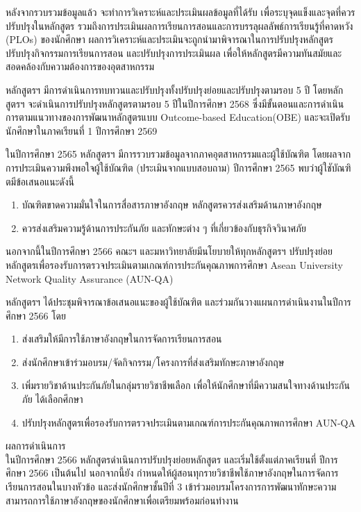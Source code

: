 หลังจากรวบรวมข้อมูลแล้ว จะทำการวิเคราะห์และประเมินผลข้อมูลที่ได้รับ เพื่อระบุจุดแข็งและจุดที่ควรปรับปรุงในหลักสูตร รวมถึงการประเมินผลการเรียนการสอนและการบรรลุผลลัพธ์การเรียนรู้ที่คาดหวัง (PLOs) ของนักศึกษา ผลการวิเคราะห์และประเมินจะถูกนำมาพิจารณาในการปรับปรุงหลักสูตร ปรับปรุงกิจกรรมการเรียนการสอน และปรับปรุงการประเมินผล เพื่อให้หลักสูตรมีความทันสมัยและสอดคล้องกับความต้องการของอุตสาหกรรม

หลักสูตรฯ มีการดำเนินการทบทวนและปรับปรุงทั้งปรับปรุงย่อยและปรับปรุงตามรอบ 5 ปี โดยหลักสูตรฯ จะดำเนินการปรับปรุงหลักสูตรตามรอบ 5 ปีในปีการศึกษา 2568 ซึ่งมีขั้นตอนและการดำเนินการตามแนวทางของการพัฒนาหลักสูตรแบบ Outcome-based Education(OBE) และจะเปิดรับนักศึกษาในภาคเรียนที่ 1 ปีการศึกษา 2569

ในปีการศึกษา 2565 หลักสูตรฯ มีการรวบรวมข้อมูลจากภาคอุตสาหกรรมและผู้ใช้บัณฑิต
โดยผลจากการประเมินความพึงพอใจผู้ใช้บัณฑิต (ประเมินจากแบบสอบถาม) ปีการศึกษา 2565 พบว่าผู้ใชับัณฑิตมีข้อเสนอแนะดังนี้
\begin{enumerate}
	\item บัณฑิตขาดความมั่นใจในการสื่อสารภาษาอังกฤษ หลักสูตรควรส่งเสริมด้านภาษาอังกฤษ
	\item ควรส่งเสริมความรู้ด้านการประกันภัย และทักษะต่าง ๆ ที่เกี่ยวข้องกับธุรกิจวินาศภัย
\end{enumerate}

นอกจากนี้ในปีการศึกษา 2566 คณะฯ และมหาวิทยาลัยมีนโยบายให้ทุกหลักสูตรฯ ปรับปรุงย่อยหลักสูตรเพื่อรองรับการตรวจประเมินตามเกณฑ์การประกันคุณภาพการศึกษา Asean University Network Quality Assurance (AUN-QA) 

หลักสูตรฯ ได้ประชุมพิจารณาข้อเสนอแนะของผู้ใช้บัณฑิต และร่วมกันวางแผนการดำเนินงานในปีการศึกษา 2566 โดย
\begin{enumerate}
	\item ส่งเสริมให้มีการใช้ภาษาอังกฤษในการจัดการเรียนการสอน
	\item ส่งนักศึกษาเข้าร่วมอบรม/จัดกิจกรรม/โครงการที่ส่งเสริมทักษะภาษาอังกฤษ
	\item เพิ่มรายวิชาด้านประกันภัยในกลุ่มรายวิชาชีพเลือก เพื่อให้นักศึกษาที่มีความสนใจทางด้านประกันภัย ได้เลือกศึกษา
	\item ปรับปรุงหลักสูตรเพื่อรองรับการตรวจประเมินตามเกณฑ์การประกันคุณภาพการศึกษา AUN-QA
\end{enumerate}
ผลการดำเนินการ\\
ในปีการศึกษา 2566 หลักสูตรดำเนินการปรับปรุงย่อยหลักสูตร และเริ่มใช้ตั้งแต่ภาคเรียนที่ ปีการศึกษา 2566 เป็นต้นไป นอกจากนี้ยัง กำหนดให้ผู้สอนทุกรายวิชาชีพใช้ภาษาอังกฤษในการจัดการเรียนการสอนในบางหัวข้อ และส่งนักศึกษาชั้นปีที่ 3 เข้าร่วมอบรมโครงการการพัฒนาทักษะความสามารถการใช้ภาษาอังกฤษของนักศึกษาเพื่อเตรียมพร้อมก่อนทำงาน

